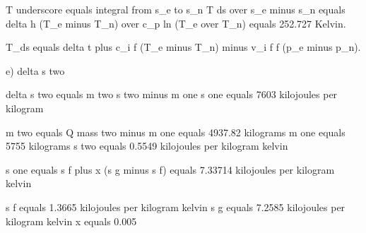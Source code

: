 T underscore equals integral from s_e to s_n T ds over s_e minus s_n equals delta h (T_e minus T_n) over c_p ln (T_e over T_n) equals 252.727 Kelvin. 

T_ds equals delta t plus c_i f (T_e minus T_n) minus v_i f f (p_e minus p_n).

e) delta s two

delta s two equals m two s two minus m one s one equals 7603 kilojoules per kilogram

m two equals Q mass two minus m one equals 4937.82 kilograms
m one equals 5755 kilograms
s two equals 0.5549 kilojoules per kilogram kelvin

s one equals s f plus x (s g minus s f) equals 7.33714 kilojoules per kilogram kelvin

s f equals 1.3665 kilojoules per kilogram kelvin
s g equals 7.2585 kilojoules per kilogram kelvin
x equals 0.005